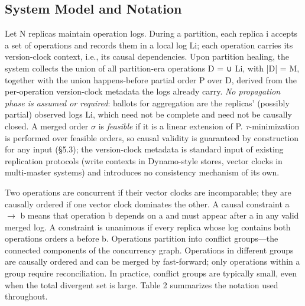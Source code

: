 \documentclass[10pt,twocolumn]{article}
\begin{document}
\subsection{System Model and Notation}
Let N replicas maintain operation logs. During a partition, each replica i accepts a set of operations and records them in a local log Li; each operation carries its version-clock context, i.e., its causal dependencies. Upon partition healing, the system collects the union of all partition-era operations D = ∪ Li, with |D| = M, together with the union happens-before partial order P over D, derived from the per-operation version-clock metadata the logs already carry. \emph{No propagation phase is assumed or required}: ballots for aggregation are the replicas' (possibly partial) observed logs Li, which need not be complete and need not be causally closed. A merged order $\sigma$ is \emph{feasible} if it is a linear extension of P. $\tau$-minimization is performed over feasible orders, so causal validity is guaranteed by construction for any input (§5.3); the version-clock metadata is standard input of existing replication protocols (write contexts in Dynamo-style stores, vector clocks in multi-master systems) and introduces no consistency mechanism of its own.

Two operations are concurrent if their vector clocks are incomparable; they are causally ordered if one vector clock dominates the other. A causal constraint a $\rightarrow$ b means that operation b depends on a and must appear after a in any valid merged log. A constraint is unanimous if every replica whose log contains both operations orders a before b. Operations partition into conflict groups—the connected components of the concurrency graph. Operations in different groups are causally ordered and can be merged by fast-forward; only operations within a group require reconciliation. In practice, conflict groups are typically small, even when the total divergent set is large. Table 2 summarizes the notation used throughout.
\end{document}
